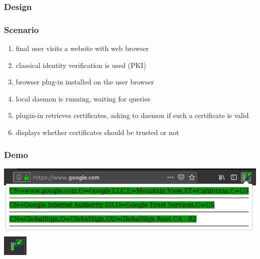 \begin{frame}
	\frametitle{Design}
	\begin{center}
	\end{center}
\end{frame}

\begin{frame}
	\frametitle{Scenario}
	\begin{alertblock}{}
		\begin{enumerate}
			\item final user visits a website with web browser
			\item classical identity verification is used (PKI)
			\item browser plug-in installed on the user browser
			\item local daemon is running, waiting for queries
			\item plugin-in retrieves certificates, asking to daemon if such a certificate is valid
			\item displays whether certificates should be trusted or not
		\end{enumerate}
	\end{alertblock}
\end{frame}


\begin{frame}
	\frametitle{Demo}
	\begin{center}
		\includegraphics[scale=0.4]{figs/green_certs.png}
		\includegraphics{figs/green_tick.png}
	\end{center}
\end{frame}

